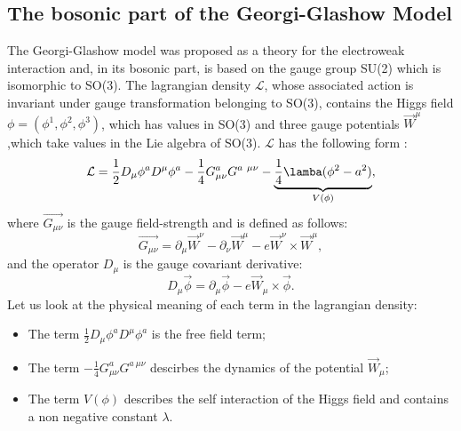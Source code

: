 \documentclass[main.tex]{subfiles}
\begin{document}
\subsection{The bosonic part of the Georgi-Glashow Model}
The Georgi-Glashow model was proposed as a theory for the electroweak interaction and, in its bosonic part, is based on the gauge group SU(2) which is isomorphic to SO(3).
The lagrangian density $\mathcal{L}$, whose associated action is invariant under gauge transformation belonging to SO(3), contains the Higgs field $\phi = ( \phi^1, \phi^2 , \phi^3)$, which has values in SO(3) and three gauge potentials $\Vec{W}^\mu$,which take values in the Lie algebra of SO(3).
$\mathcal{L}$ has the following form :
\begin{equation}
\mathcal{L}= \frac{1}{2}D_{\mu}\phi^a D^\mu \phi^a  -\frac{1}{4} G_{\mu \nu}^a G^{a \ \mu \nu} - \underbrace{\frac{1}{4}\lamba (\phi^2 -a^2)}_{V(\phi)},
\end{equation}
where $\Vec{G_{\mu \nu}}$ is the gauge field-strength and is defined as follows:
\begin{equation}
\Vec{G_{\mu \nu}} = \partial_{\mu}  \Vec{W}^\nu -\partial_{\nu}  \Vec{W}^\mu - e \Vec{W}^\nu \times \Vec{W}^\mu,
\end{equation}
and the operator $D_{\mu}$ is the gauge covariant derivative:
\begin{equation}
D_\mu \Vec{\phi} = \partial_\mu \Vec{\phi} - e \Vec{W}_\mu \times \Vec{\phi}.
\end{equation}
Let us look at the physical meaning of each term in the lagrangian density:
\begin{itemize}
    \item The term $\frac{1}{2}D_{\mu}\phi^a D^\mu \phi^a $ is the free field term;
    \item The term  $-\frac{1}{4} G_{\mu \nu}^a G^{a \ \mu \nu}$ descirbes the dynamics of the potential $\Vec{W}_{\mu}$;
    \item The term  $V(\phi) $ describes the self interaction of the Higgs field and contains a non negative constant $\lambda$.
\end{itemize}
\\
\end{document}
